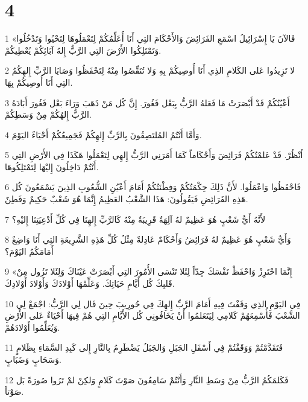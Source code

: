 \chapter{4}

\par 1 «فَالآنَ يَا إِسْرَائِيلُ اسْمَعِ الفَرَائِضَ وَالأَحْكَامَ التِي أَنَا أُعَلِّمُكُمْ لِتَعْمَلُوهَا لِتَحْيُوا وَتَدْخُلُوا وَتَمْتَلِكُوا الأَرْضَ التِي الرَّبُّ إِلهُ آبَائِكُمْ يُعْطِيكُمْ.
\par 2 لا تَزِيدُوا عَلى الكَلامِ الذِي أَنَا أُوصِيكُمْ بِهِ وَلا تُنَقِّصُوا مِنْهُ لِتَحْفَظُوا وَصَايَا الرَّبِّ إِلهِكُمُ التِي أَنَا أُوصِيكُمْ بِهَا.
\par 3 أَعْيُنُكُمْ قَدْ أَبْصَرَتْ مَا فَعَلهُ الرَّبُّ بِبَعْل فَغُورَ. إِنَّ كُل مَنْ ذَهَبَ وَرَاءَ بَعْل فَغُورَ أَبَادَهُ الرَّبُّ إِلهُكُمْ مِنْ وَسَطِكُمْ.
\par 4 وَأَمَّا أَنْتُمُ المُلتَصِقُونَ بِالرَّبِّ إِلهِكُمْ فَجَمِيعُكُمْ أَحْيَاءٌ اليَوْمَ.
\par 5 اُنْظُرْ. قَدْ عَلمْتُكُمْ فَرَائِضَ وَأَحْكَاماً كَمَا أَمَرَنِي الرَّبُّ إِلهِي لِتَعْمَلُوا هَكَذَا فِي الأَرْضِ التِي أَنْتُمْ دَاخِلُونَ إِليْهَا لِتَمْتَلِكُوهَا.
\par 6 فَاحْفَظُوا وَاعْمَلُوا. لأَنَّ ذَلِكَ حِكْمَتُكُمْ وَفِطْنَتُكُمْ أَمَامَ أَعْيُنِ الشُّعُوبِ الذِينَ يَسْمَعُونَ كُل هَذِهِ الفَرَائِضِ فَيَقُولُونَ: هَذَا الشَّعْبُ العَظِيمُ إِنَّمَا هُوَ شَعْبٌ حَكِيمٌ وَفَطِنٌ.
\par 7 لأَنَّهُ أَيُّ شَعْبٍ هُوَ عَظِيمٌ لهُ آلِهَةٌ قَرِيبَةٌ مِنْهُ كَالرَّبِّ إِلهِنَا فِي كُلِّ أَدْعِيَتِنَا إِليْهِ؟
\par 8 وَأَيُّ شَعْبٍ هُوَ عَظِيمٌ لهُ فَرَائِضُ وَأَحْكَامٌ عَادِلةٌ مِثْلُ كُلِّ هَذِهِ الشَّرِيعَةِ التِي أَنَا وَاضِعٌ أَمَامَكُمُ اليَوْمَ؟
\par 9 «إِنَّمَا احْتَرِزْ وَاحْفَظْ نَفْسَكَ جِدّاً لِئَلا تَنْسَى الأُمُورَ التِي أَبْصَرَتْ عَيْنَاكَ وَلِئَلا تَزُول مِنْ قَلبِكَ كُل أَيَّامِ حَيَاتِكَ. وَعَلِّمْهَا أَوْلادَكَ وَأَوْلادَ أَوْلادِكَ.
\par 10 فِي اليَوْمِ الذِي وَقَفْتَ فِيهِ أَمَامَ الرَّبِّ إِلهِكَ فِي حُورِيبَ حِينَ قَال لِي الرَّبُّ: اجْمَعْ لِي الشَّعْبَ فَأُسْمِعَهُمْ كَلامِي لِيَتَعَلمُوا أَنْ يَخَافُونِي كُل الأَيَّامِ التِي هُمْ فِيهَا أَحْيَاءٌ عَلى الأَرْضِ وَيُعَلِّمُوا أَوْلادَهُمْ.
\par 11 فَتَقَدَّمْتُمْ وَوَقَفْتُمْ فِي أَسْفَلِ الجَبَلِ وَالجَبَلُ يَضْطَرِمُ بِالنَّارِ إِلى كَبِدِ السَّمَاءِ بِظَلامٍ وَسَحَابٍ وَضَبَابٍ.
\par 12 فَكَلمَكُمُ الرَّبُّ مِنْ وَسَطِ النَّارِ وَأَنْتُمْ سَامِعُونَ صَوْتَ كَلامٍ وَلكِنْ لمْ تَرُوا صُورَةً بَل صَوْتاً.
